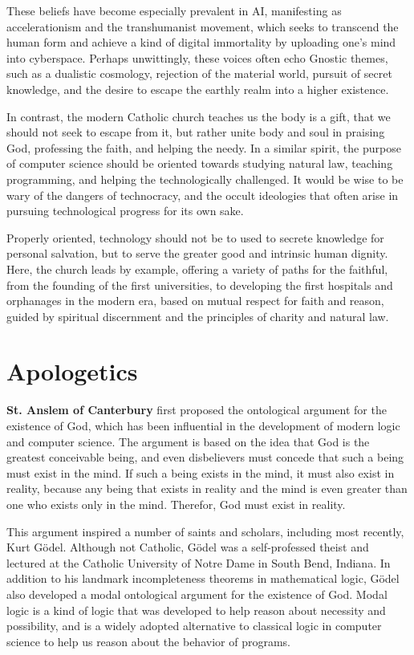 \documentclass[sigplan,nonacm]{acmart}\settopmatter{printfolios=false,printccs=false,printacmref=false}
\begin{document}
  These beliefs have become especially prevalent in AI, manifesting as accelerationism and the transhumanist movement, which seeks to transcend the human form and achieve a kind of digital immortality by uploading one's mind into cyberspace. Perhaps unwittingly, these voices often echo Gnostic themes, such as a dualistic cosmology, rejection of the material world, pursuit of secret knowledge, and the desire to escape the earthly realm into a higher existence.

  In contrast, the modern Catholic church teaches us the body is a gift, that we should not seek to escape from it, but rather unite body and soul in praising God, professing the faith, and helping the needy. In a similar spirit, the purpose of computer science should be oriented towards studying natural law, teaching programming, and helping the technologically challenged. It would be wise to be wary of the dangers of technocracy, and the occult ideologies that often arise in pursuing technological progress for its own sake.

  Properly oriented, technology should not be to used to secrete knowledge for personal salvation, but to serve the greater good and intrinsic human dignity. Here, the church leads by example, offering a variety of paths for the faithful, from the founding of the first universities, to developing the first hospitals and orphanages in the modern era, based on mutual respect for faith and reason, guided by spiritual discernment and the principles of charity and natural law.

  \section{Apologetics}

  \textbf{St. Anslem of Canterbury} first proposed the ontological argument for the existence of God, which has been influential in the development of modern logic and computer science. The argument is based on the idea that God is the greatest conceivable being, and even disbelievers must concede that such a being must exist in the mind. If such a being exists in the mind, it must also exist in reality, because any being that exists in reality and the mind is even greater than one who exists only in the mind. Therefor, God must exist in reality.

  This argument inspired a number of saints and scholars, including most recently, Kurt G\"odel. Although not Catholic, G\"odel was a self-professed theist and lectured at the Catholic University of Notre Dame in South Bend, Indiana. In addition to his landmark incompleteness theorems in mathematical logic, G\"odel also developed a modal ontological argument for the existence of God. Modal logic is a kind of logic that was developed to help reason about necessity and possibility, and is a widely adopted alternative to classical logic in computer science to help us reason about the behavior of programs.
\end{document}
